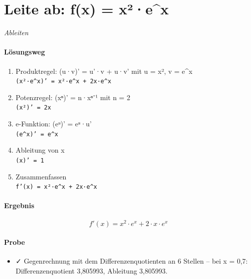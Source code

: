 \documentclass[11pt,a4paper]{article}
\begin{document}
\section*{Leite ab: f(x) = x²·e\textasciicircum{}x}
\textit{Ableiten}

\paragraph{Lösungsweg}
\begin{enumerate}
  \item Produktregel: (u·v)' = u'·v + u·v' mit u = x², v = e\textasciicircum{}x\\
  \texttt{(x²·e\textasciicircum{}x)' = x²·e\textasciicircum{}x + 2x·e\textasciicircum{}x}
  \item Potenzregel: (xⁿ)' = n·xⁿ⁻¹ mit n = 2\\
  \texttt{(x²)' = 2x}
  \item e-Funktion: (eᵘ)' = eᵘ·u'\\
  \texttt{(e\textasciicircum{}x)' = e\textasciicircum{}x}
  \item Ableitung von x\\
  \texttt{(x)' = 1}
  \item Zusammenfassen\\
  \texttt{f'(x) = x²·e\textasciicircum{}x + 2x·e\textasciicircum{}x}
\end{enumerate}
\paragraph{Ergebnis}
\[ f'(x) = x^{2} \cdot e^{x} + 2 \cdot x \cdot e^{x} \]
\paragraph{Probe}
\begin{itemize}
  \item ✓ Gegenrechnung mit dem Differenzenquotienten an 6 Stellen – bei x = 0,7: Differenzenquotient 3,805993, Ableitung 3,805993.
\end{itemize}
\end{document}
